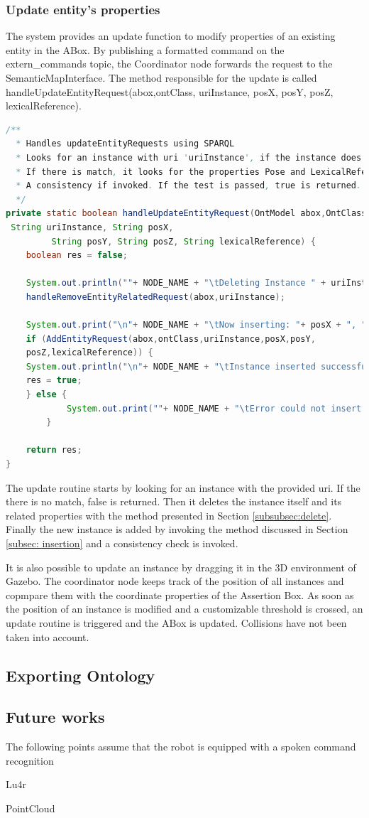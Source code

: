 \subsubsection{Update entity's properties}
The system provides an update function to modify properties of an existing entity in the ABox. By publishing a formatted command on the extern\_commands topic, the Coordinator node forwards the request to the SemanticMapInterface. The method responsible for the update is called handleUpdateEntityRequest(abox,ontClass, uriInstance, posX, posY, posZ,  lexicalReference).

\begin{lstlisting}[language=Java]
/**
  * Handles updateEntityRequests using SPARQL
  *	Looks for an instance with uri 'uriInstance', if the instance does not exist returns flase.
  * If there is match, it looks for the properties Pose and LexicalReference and updates it. 
  * A consistency if invoked. If the test is passed, true is returned. Otherwise False.
  */
private static boolean handleUpdateEntityRequest(OntModel abox,OntClass ontClass,
 String uriInstance, String posX,
		 String posY, String posZ, String lexicalReference) {
	boolean res = false;

	System.out.println(""+ NODE_NAME + "\tDeleting Instance " + uriInstance);
	handleRemoveEntityRelatedRequest(abox,uriInstance);

	System.out.print("\n"+ NODE_NAME + "\tNow inserting: "+ posX + ", " + posY + " , " + posZ);
	if (AddEntityRequest(abox,ontClass,uriInstance,posX,posY,
	posZ,lexicalReference)) {
	System.out.println("\n"+ NODE_NAME + "\tInstance inserted successfully");
	res = true;
   	} else {
    		System.out.print(""+ NODE_NAME + "\tError could not insert instance consistency problem");
    	}
	
	return res;
}
\end{lstlisting}

The update routine starts by looking for an instance with the provided uri. If the there is no match, false is returned. Then it deletes the instance itself and its related properties with the method presented in Section \ref{subsubsec:delete}. Finally the new instance is added by invoking the method discussed in Section \ref{subsec: insertion} and a consistency check is invoked. 

It is also possible to update an instance by dragging it in the 3D environment of Gazebo. The coordinator node keeps track of the position of all instances and copmpare them with the coordinate properties of the Assertion Box. As soon as the position of an instance is modified and a customizable threshold is crossed, an update routine is triggered and the ABox is updated. Collisions have not been taken into account.

\subsection{Exporting Ontology}


\subsection{Future works}

The following points assume that the robot is equipped with a spoken command recognition

Lu4r

PointCloud